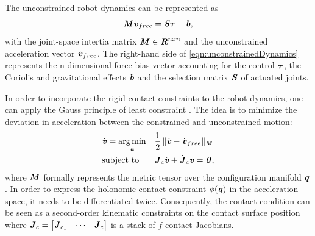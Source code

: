 The unconstrained robot dynamics can be represented as 
\begin{equation}\label{eqn:unconstrainedDynamics}
\bm{\mathit{M}}\dot{\bm{\mathit{v}}}_{free}=\bm{\mathit{S\tau}}-\bm{\mathit{b}}, 
\end{equation}
with the joint-space intertia matrix $\bm{\mathit{M}}\in \bm{\mathit{R}}^{nxn}$ and the unconstrained acceleration vector $\dot{\bm{\mathit{v}}}_{free}$. The right-hand side of \cref{eqn:unconstrainedDynamics} represents the n-dimensional force-bias vector accounting for the control $\bm{\mathit{\tau}}$, the Coriolis and gravitational effects $\bm{\mathit{b}}$ and the selection matrix $\bm{\mathit{S}}$ of actuated joints. 

In order to incorporate the rigid contact constraints to the robot dynamics, one can apply the Gauss principle of least constraint \cite{udwadia1992new}. The idea is to minimize the deviation in acceleration between the constrained and unconstrained motion:
\begin{equation}\label{eqn:gaussMinimization}
\begin{aligned} & \dot{\bm{\mathit{v}}} = \underset{\bm{\mathit{a}}}{\arg\min} & & \frac{1}{2}\,\|\dot{\bm{\mathit{v}}}-\dot{\bm{\mathit{v}}}_{free}\|_{\bm{\mathit{M}}} \\ & \textrm{subject to} & & \bm{\mathit{J}}_{c} \dot{\bm{\mathit{v}}} + \dot{\bm{\mathit{J}}}_c \bm{\mathit{v}} = \bm{\mathit{0}}, \end{aligned}
\end{equation}
where $\bm{\mathit{M}}$ formally represents the metric tensor over the configuration manifold $\bm{\mathit{q}}$. In order to express the holonomic contact constraint $\phi(\bm{\mathit{q}})$ in the acceleration space, it needs to be differentiated twice. Consequently, the contact condition can be seen as a second-order kinematic constraints on the contact surface position where $\bm{\mathit{J}}_{c}= \begin{bmatrix} \bm{\mathit{J}}_{c_1} & \cdots & \bm{\mathit{J}}_{c}\end{bmatrix}$ is a stack of $f$ contact Jacobians. 

